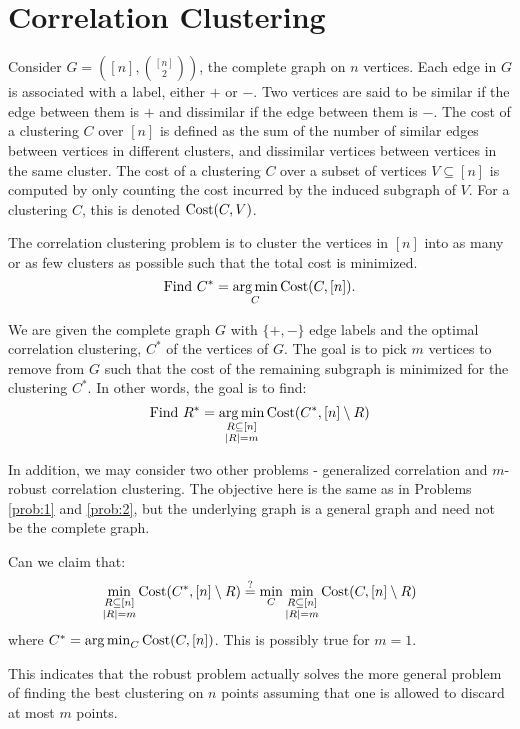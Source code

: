 \section{Correlation Clustering}
Consider $G = ([n],\binom{[n]}{2})$, the complete graph on $n$ vertices. Each edge in $G$ is associated with a label, either $+$ or $-$. Two vertices are said to be similar if the edge between them is $+$ and dissimilar if the edge between them is $-$. The cost of a clustering $C$ over $[n]$ is defined as the sum of the number of similar edges between vertices in different clusters, and dissimilar vertices between vertices in the same cluster. The cost of a clustering $C$ over a subset of vertices $V \subseteq [n]$ is computed by only counting the cost incurred by the induced subgraph of $V$. For a clustering $C$, this is denoted $\mathrm{Cost} (C, V)$.

\begin{problem} \label{prob:1}
	The correlation clustering problem is to cluster the vertices in $[n]$ into as many or as few clusters as possible such that the total cost is minimized.
	\begin{equation*}
		\text{Find } C^* = \operatorname*{arg\,min}_C \mathrm{Cost} (C, [n]).
	\end{equation*}
\end{problem}

\begin{problem} \label{prob:2}
	We are given the complete graph $G$ with $\{ +,- \}$ edge labels and the optimal correlation clustering, $C^*$ of the vertices of $G$. The goal is to pick $m$ vertices to remove from $G$ such that the cost of the remaining subgraph is minimized for the clustering $C^*$. In other words, the goal is to find:
	\begin{equation*}
		\mathrm{Find }\ R^* = \operatorname*{arg\,min}_{\substack{R \subseteq [n] \\ |R| = m}} \mathrm{Cost} (C^*, [n] \setminus R)
	\end{equation*}
\end{problem}

In addition, we may consider two other problems - generalized correlation and $m$-robust correlation clustering. The objective here is the same as in Problems \ref{prob:1} and \ref{prob:2}, but the underlying graph is a general graph and need not be the complete graph.

\begin{proposition}
Can we claim that:
	\begin{equation*}
		\min_{\substack{R \subseteq [n] \\ |R| = m}} \mathrm{Cost} (C^*, [n] \setminus R) \overset{?}{=} \min_C \min_{\substack{R \subseteq [n] \\ |R| = m}} \mathrm{Cost} (C, [n] \setminus R)
	\end{equation*}
where $C^* = \operatorname*{arg\,min}_{C} \mathrm{Cost} (C, [n])$. This is possibly true for $m=1$.
\end{proposition}
This indicates that the robust problem actually solves the more general problem of finding the best clustering on $n$ points assuming that one is allowed to discard at most $m$ points.